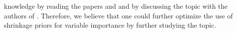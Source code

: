 knowledge by reading the papers \citet{zhang2020bayesian} and \citet{aguilar2024generalized} and by discussing the topic with the authors of \citet{aguilar2024generalized}. Therefore, we believe that one could further optimize the use of shrinkage priors for variable importance by further studying the topic.
